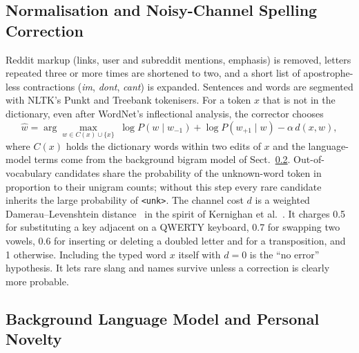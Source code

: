 \documentclass[runningheads]{llncs}
\begin{document}
\subsection{Normalisation and Noisy-Channel Spelling Correction}

Reddit markup (links, user and subreddit mentions, emphasis) is removed, letters repeated three or more times are shortened to two, and a short list of apostrophe-less contractions (\emph{im}, \emph{dont}, \emph{cant}) is expanded. Sentences and words are segmented with NLTK's Punkt and Treebank tokenisers. For a token $x$ that is not in the dictionary, even after WordNet's inflectional analysis, the corrector chooses
\begin{equation}
\hat{w} = \arg\max_{w \in C(x) \cup \{x\}} \; \log P(w \mid w_{-1}) + \log P(w_{+1} \mid w) - \alpha\, d(x, w),
\end{equation}
where $C(x)$ holds the dictionary words within two edits of $x$ and the language-model terms come from the background bigram model of Sect.~\ref{sec:lm}. Out-of-vocabulary candidates share the probability of the unknown-word token in proportion to their unigram counts; without this step every rare candidate inherits the large probability of \texttt{<unk>}. The channel cost $d$ is a weighted Damerau--Levenshtein distance~\cite{damerau1964technique} in the spirit of Kernighan et al.~\cite{kernighan1990spelling}. It charges 0.5 for substituting a key adjacent on a QWERTY keyboard, 0.7 for swapping two vowels, 0.6 for inserting or deleting a doubled letter and for a transposition, and 1 otherwise. Including the typed word $x$ itself with $d=0$ is the ``no error'' hypothesis. It lets rare slang and names survive unless a correction is clearly more probable.

\subsection{Background Language Model and Personal Novelty}
\label{sec:lm}
\end{document}
